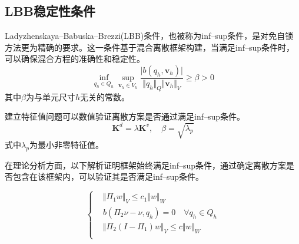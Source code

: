 \subsection{LBB稳定性条件}
Ladyzhenskaya--Babuska--Brezzi(LBB)条件，也被称为inf--sup条件\cite{babuska1997a,bathe1996}，是对免自锁方法更为精确的要求。这一条件基于混合离散框架构建，当满足inf--sup条件时，可以确保混合方程的准确性和稳定性。
\begin{equation}\label{infsup}
    \inf_{q_h \in Q_h} \sup_{\boldsymbol v_h \in V_h} \frac{\vert b(q_h,\boldsymbol v_h) \vert}{\Vert q_h \Vert_Q \Vert \boldsymbol v_h \Vert_V} \ge \beta > 0
\end{equation}
其中$\beta$为与单元尺寸$h$无关的常数。

建立特征值问题\cite{chapelle1993}可以数值验证离散方案是否通过满足inf--sup条件。
\begin{equation}\label{eigenvalue}
    \boldsymbol K^d=\lambda\boldsymbol K^v,\quad \beta=\sqrt{\lambda_p}
\end{equation}
式中$\lambda_p$为最小非零特征值。

在理论分析方面，以下解析证明框架\cite{chapelle1993}始终满足inf--sup条件，通过确定离散方案是否包含在该框架内，可以验证其是否满足inf--sup条件。

\begin{equation}\label{analy}
    \begin{cases}
        &\Vert\Pi_1 w\Vert_V \le c_1\Vert w\Vert_W \\
        &b(\Pi_2\nu-\nu,q_h)=0 \quad \forall q_h \in Q_h\\
        &\Vert \Pi_2(I-\Pi_1)w \Vert_V \le c \Vert w\Vert_W \\
    \end{cases}
\end{equation}

